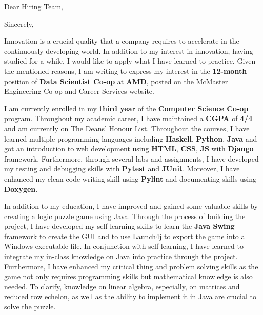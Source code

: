 \documentclass[12pt,letterpaper,sans]{moderncv} %
\begin{document}


\clearpage

\vspace{-1.0em}
\date{\today} %
\opening{Dear Hiring Team,} %
\closing{Sincerely,} %


\makelettertitle %

\justifying

Innovation is a crucial quality that a company requires to accelerate in the continuously developing world. In addition to my interest in innovation, having studied for a while, I would like to apply what I have learned to practice. Given the mentioned reasons, I am writing to express my interest in the \textbf{12-month} position of \textbf{Data Scientist Co-op} at \textbf{AMD}, posted on the McMaster Engineering Co-op and Career Services website.

I am currently enrolled in my \textbf{third year} of the \textbf{Computer Science Co-op} program. Throughout my academic career, I have maintained a \textbf{CGPA} of \textbf{4/4} and am currently on The Deans' Honour List. Throughout the courses, I have learned multiple programming languages including \textbf{Haskell}, \textbf{Python}, \textbf{Java} and got an introduction to web development using \textbf{HTML}, \textbf{CSS}, \textbf{JS} with \textbf{Django} framework. Furthermore, through several labs and assignments, I have developed my testing and debugging skills with \textbf{Pytest} and \textbf{JUnit}. Moreover, I have enhanced my clean-code writing skill using \textbf{Pylint} and documenting skills using \textbf{Doxygen}.

In addition to my education, I have improved and gained some valuable skills by creating a logic puzzle game using Java. Through the process of building the project, I have developed my self-learning skills to learn the \textbf{Java Swing} framework to create the GUI and to use Launch4j to export the game into a Windows executable file. In conjunction with self-learning, I have learned to integrate my in-class knowledge on Java into practice through the project. Furthermore, I have enhanced my critical thing and problem solving skills as the game not only requires programming skills but mathematical knowledge is also needed. To clarify, knowledge on linear algebra, especially, on matrices and reduced row echelon, as well as the ability to implement it in Java are crucial to solve the puzzle.
\end{document}
